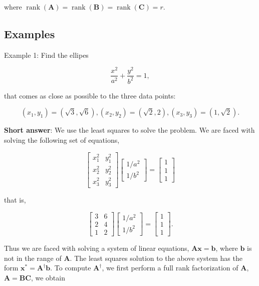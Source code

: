 where \(\operatorname{rank}(\boldsymbol{A})=\operatorname{rank}(\boldsymbol{B})=\operatorname{rank}(\boldsymbol{C})=r\).


\subsection{Examples}
Example 1: Find the ellipes

\[
	\frac{x^{2}}{a^{2}}+\frac{y^{2}}{b^{2}}=1,
\]

that comes as close as possible to the three data points:

\[
	\left(x_{1}, y_{1}\right)=(\sqrt{3}, \sqrt{6}),\left(x_{2}, y_{2}\right)=(\sqrt{2}, 2),\left(x_{3}, y_{3}\right)=(1, \sqrt{2}) .
\]

\textbf{Short answer}:
We use the least squares to solve the problem. We are faced with solving the following set of equations,

\[
	\left[\begin{array}{ll}
		x_{1}^{2} & y_{1}^{2} \\
		x_{2}^{2} & y_{2}^{2} \\
		x_{3}^{2} & y_{3}^{2}
	\end{array}\right]\left[\begin{array}{c}
		1 / a^{2} \\
		1 / b^{2}
	\end{array}\right]=\left[\begin{array}{l}
		1 \\
		1 \\
		1
	\end{array}\right]
\]

that is,

\[
	\left[\begin{array}{ll}
		3 & 6 \\
		2 & 4 \\
		1 & 2
	\end{array}\right]\left[\begin{array}{l}
		1 / a^{2} \\
		1 / b^{2}
	\end{array}\right]=\left[\begin{array}{l}
		1 \\
		1 \\
		1
	\end{array}\right] .
\]

Thus we are faced with solving a system of linear equations, \(\boldsymbol{A} \boldsymbol{x}=\boldsymbol{b}\), where \(\boldsymbol{b}\) is not in the range of \(\boldsymbol{A}\). The least squares solution to the above system has the form \(\boldsymbol{x}^{*}=\boldsymbol{A}^{\dagger} \boldsymbol{b}\). To compute \(\boldsymbol{A}^{\dagger}\), we first perform a full rank factorization of \(\boldsymbol{A}\), \(\boldsymbol{A}=\boldsymbol{B} \boldsymbol{C}\), we obtain

